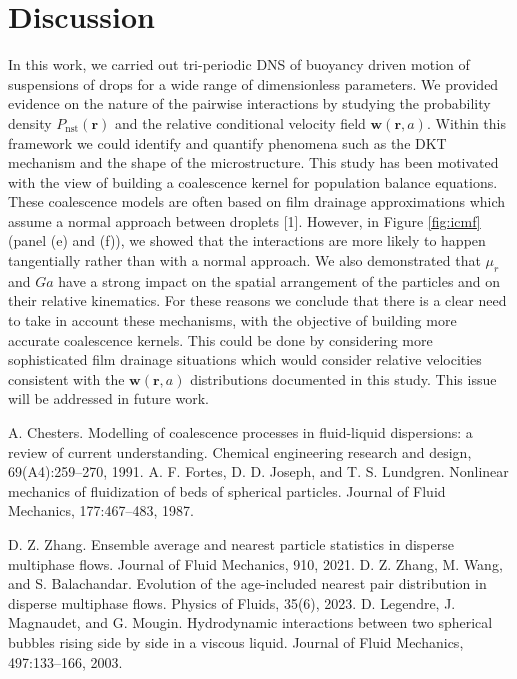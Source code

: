 \documentclass[9pt,a4paper]{article}
\begin{document}
\section{Discussion}
\vspace*{-10pt}
In this work, we carried out tri-periodic DNS of buoyancy driven motion of suspensions of drops for a wide range of dimensionless parameters. 
We provided evidence on the nature of the pairwise interactions by studying the probability density $P_\text{nst}(\textbf{r})$ and the relative conditional velocity field $\textbf{w}(\textbf{r},a)$. 
Within this framework  we could identify and quantify phenomena such as the DKT mechanism and the shape of the microstructure. 
This study has been motivated with the view of building a coalescence kernel for population balance equations. 
These coalescence models are often based on film drainage approximations which assume a normal approach between droplets [1].  
However, in Figure \ref{fig:icmf} (panel (e) and (f)), we showed that the interactions are more likely to happen tangentially rather than with a normal approach. 
We also demonstrated that $\mu_r$ and $Ga$ have a strong impact on the spatial arrangement of the particles and on their relative kinematics. 
For these reasons we conclude that there is a clear need to take in account these mechanisms, with the objective of building more accurate coalescence kernels. 
This could be done by considering more sophisticated film drainage situations which would consider relative velocities consistent with the $\textbf{w}(\textbf{r},a)$ distributions documented in this study.
This issue will be addressed in future work.  


\begin{thebibliography}{1}
    A. Chesters. Modelling of coalescence processes in fluid-liquid dispersions: a review of current understanding. Chemical
    engineering research and design, 69(A4):259–270, 1991.
    A. F. Fortes, D. D. Joseph, and T. S. Lundgren. Nonlinear mechanics of fluidization of beds of spherical particles. Journal of
Fluid Mechanics, 177:467–483, 1987.
    
    D. Z. Zhang. Ensemble average and nearest particle statistics in disperse multiphase flows. Journal of Fluid Mechanics, 910,
    2021.
    D. Z. Zhang, M. Wang, and S. Balachandar. Evolution of the age-included nearest pair distribution in disperse multiphase
flows. Physics of Fluids, 35(6), 2023.
D. Legendre, J. Magnaudet, and G. Mougin. Hydrodynamic interactions between two spherical bubbles rising
side by side in a viscous liquid. Journal of Fluid Mechanics, 497:133–166, 2003.
\end{thebibliography}
\end{document}
